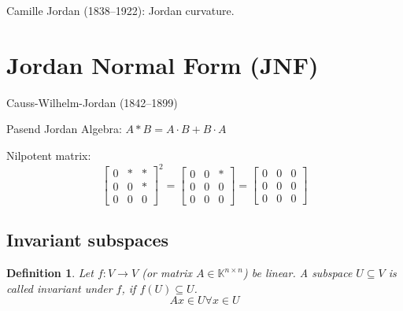 \documentclass{article}
\newtheorem{definition}{Definition}  \numberwithin{definition}{section}
\begin{document}
Camille Jordan (1838--1922): Jordan curvature.

\section{Jordan Normal Form (JNF)}

Causs-Wilhelm-Jordan (1842--1899)

Pasend Jordan Algebra: $A * B = A \cdot B + B \cdot A$

Nilpotent matrix:
\[
  \begin{bmatrix} 0 & * & * \\ 0 & 0 & * \\ 0 & 0 & 0 \end{bmatrix}^2
  = \begin{bmatrix} 0 & 0 & * \\ 0 & 0 & 0 \\ 0 & 0 & 0 \end{bmatrix}
  = \begin{bmatrix} 0 & 0 & 0 \\ 0 & 0 & 0 \\ 0 & 0 & 0 \end{bmatrix}
\]

\subsection{Invariant subspaces}

\begin{definition} %
  Let $f: V \to V$ (or matrix $A \in \mathbb K^{n\times n}$) be linear.
  A subspace $U \subseteq V$ is called \emph{invariant} under $f$, if $f(U) \subseteq U$.
  \[ Ax \in U \forall x \in U \]
\end{definition}
\end{document}
